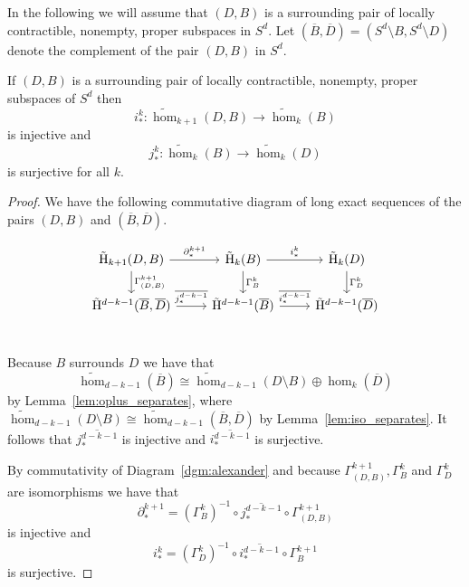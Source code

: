 In the following we will assume that $(D,B)$ is a surrounding pair of locally contractible, nonempty, proper subspaces in $S^d$.
Let $(\overline{B}, \overline{D}) = (S^d\setminus B, S^d\setminus D)$ denote the complement of the pair $(D, B)$ in $S^d$.

\begin{lemma}\label{lem:alexander_comm}
  If $(D,B)$ is a surrounding pair of locally contractible, nonempty, proper subspaces of $S^d$ then
  \[i_*^{k} : \tilde{\hom}_{k+1}(D, B)\to \tilde{\hom}_k(B)\]
  is injective and
  \[j_*^{k} : \tilde{\hom}_{k}(B)\to \tilde{\hom}_k(D)\]
  is surjective for all $k$.
\end{lemma}
\begin{proof}
  We have the following commutative diagram of long exact sequences of the pairs $(D, B)$ and $(\overline{B}, \overline{D})$.

  \begin{equation}\begin{tikzcd}\label{dgm:alexander}
    \tilde{\hom}_{k+1}(D, B)\arrow{r}{\partial_*^{k+1}}\arrow{d}{\Gamma^{k+1}_{(D, B)}} &
    \tilde{\hom}_{k}(B)\arrow{r}{i_*^{k}}\arrow{d}{\Gamma^{k}_B} &
    \tilde{\hom}_{k}(D)\arrow{d}{\Gamma^{k}_D} \\ %
    \tilde{\hom}^{d-k-1}(\overline{B}, \overline{D})\arrow{r}{\overline{j_*^{d-k-1}}} &
    \tilde{\hom}^{d-k-1}(\overline{B})\arrow{r}{\overline{i_*^{d-k-1}}} &
    \tilde{\hom}^{d-k-1}(\overline{D}) \\ %
  \end{tikzcd}\end{equation}

  Because $B$ surrounds $D$ we have that
  \[\tilde{\hom}_{d-k-1}(\overline{B}) \cong \tilde{\hom}_{d-k-1}(D\setminus B)\oplus \hom_k(\overline{D})\]
  by Lemma~\ref{lem:oplus_separates}, where $\tilde{\hom}_{d-k-1}(D\setminus B) \cong \tilde{\hom}_{d-k-1}(\overline{B}, \overline{D})$ by Lemma~\ref{lem:iso_separates}.
  It follows that $\overline{j_*^{d-k-1}}$ is injective and $\overline{i_*^{d-k-1}}$ is surjective.

  By commutativity of Diagram~\ref{dgm:alexander} and because $\Gamma_{(D,B)}^{k+1}, \Gamma_B^k$ and $\Gamma_D^k$ are isomorphisms we have that
  \[\partial_*^{k+1} = (\Gamma_B^{k})^{-1} \circ\overline{j_*^{d-k-1}}\circ \Gamma_{(D,B)}^{k+1}\]
  is injective and
  \[i_*^{k} = (\Gamma_D^{k})^{-1} \circ\overline{i_*^{d-k-1}}\circ \Gamma_B^{k+1}\]
  is surjective.
\end{proof}

